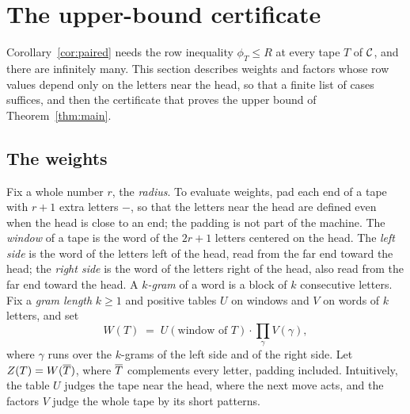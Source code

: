 \section{The upper-bound certificate}\label{sec:upper}

Corollary~\ref{cor:paired} needs the row inequality $\phi_T\le R$ at every tape $T$ of $\mathcal{C}$, and there are
infinitely many. This section describes weights and factors whose row values depend only on the letters near the
head, so that a finite list of cases suffices, and then the certificate that proves the upper bound of
Theorem~\ref{thm:main}.

\subsection{The weights}

Fix a whole number $r$, the \emph{radius}. To evaluate weights, pad each end of a tape with $r+1$ extra letters $-$,
so that the letters near the head are defined even when the head is close to an end; the padding is not part of the
machine. The \emph{window} of a tape is the word of the $2r+1$ letters centered on the head. The \emph{left side} is
the word of the letters left of the head, read from the far end toward the head; the \emph{right side} is the word of
the letters right of the head, also read from the far end toward the head. A \emph{$k$-gram} of a word is a block of
$k$ consecutive letters. Fix a \emph{gram length} $k\ge1$ and positive tables $U$ on windows and $V$ on words of $k$
letters, and set
\begin{equation}\label{eq:W}
  W(T)\;=\;U(\text{window of }T)\cdot\prod_{\gamma}V(\gamma),
\end{equation}
where $\gamma$ runs over the $k$-grams of the left side and of the right side. Let $Z(T)=W(\overline{T})$, where $\overline{T}$
complements every letter, padding included. Intuitively, the table $U$ judges the tape near the head, where the next
move acts, and the factors $V$ judge the whole tape by its short patterns.

